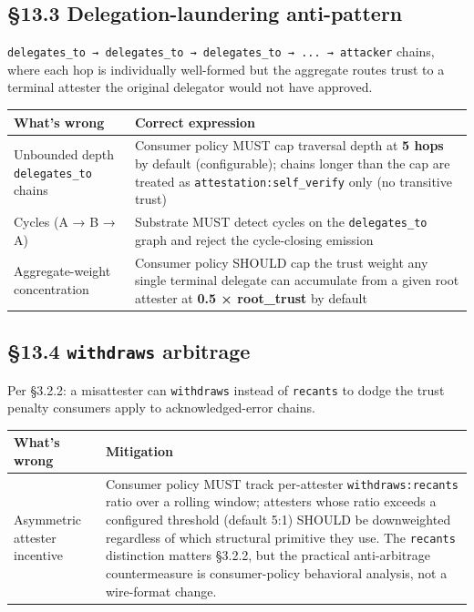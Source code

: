 \documentclass[10pt]{article}
\begin{document}
\subsection*{§13.3 Delegation-laundering anti-pattern}


\texttt{delegates\_to → delegates\_to → delegates\_to → ... → attacker} chains, where each hop is individually well-formed but the aggregate routes trust to a terminal attester the original delegator would not have approved.


{\footnotesize
\begin{longtable}{|p{8.0cm}|p{8.0cm}|}\hline
\textbf{What's wrong} & \textbf{Correct expression} \\ \hline\endhead
Unbounded depth \texttt{delegates\_to} chains & Consumer policy MUST cap traversal depth at \textbf{5 hops} by default (configurable); chains longer than the cap are treated as \texttt{attestation:self\_verify} only (no transitive trust) \\ \hline
Cycles (A → B → A) & Substrate MUST detect cycles on the \texttt{delegates\_to} graph and reject the cycle-closing emission \\ \hline
Aggregate-weight concentration & Consumer policy SHOULD cap the trust weight any single terminal delegate can accumulate from a given root attester at \textbf{0.5 × root\_trust} by default \\ \hline
\end{longtable}}


\subsection*{§13.4 \texttt{withdraws} arbitrage}


Per §3.2.2: a misattester can \texttt{withdraws} instead of \texttt{recants} to dodge the trust penalty consumers apply to acknowledged-error chains.


{\footnotesize
\begin{longtable}{|p{8.0cm}|p{8.0cm}|}\hline
\textbf{What's wrong} & \textbf{Mitigation} \\ \hline\endhead
Asymmetric attester incentive & Consumer policy MUST track per-attester \texttt{withdraws:recants} ratio over a rolling window; attesters whose ratio exceeds a configured threshold (default 5:1) SHOULD be downweighted regardless of which structural primitive they use. The \texttt{recants} distinction matters §3.2.2, but the practical anti-arbitrage countermeasure is consumer-policy behavioral analysis, not a wire-format change. \\ \hline
\end{longtable}}
\end{document}
